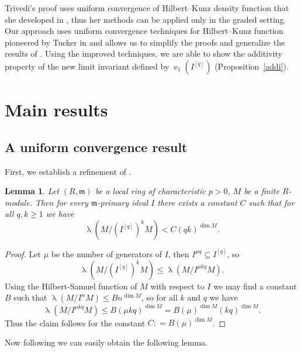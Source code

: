 \documentclass[12pt]{amsart}
\newcommand{\length}{\operatorname{\lambda}}
\newcommand{\mf}[1]{\mathfrak #1}
\DeclareMathOperator{\eh}{e}
\renewcommand{\frq}[1]{{#1}^{[q]}}
\newtheorem{lemma}[theorem]{Lemma}
\theoremstyle{definition}
\theoremstyle{remark}
\numberwithin{theorem}{section}
\numberwithin{equation}{section}
\begin{document}
Trivedi's proof uses uniform convergence of 
Hilbert--Kunz density function that she developed in \cite{Trivedi2},
thus her methods can be applied only in the graded setting. 
Our approach uses uniform convergence techniques for Hilbert--Kunz function
pioneered by Tucker in \cite{Tucker} and allows us to simplify the proofs and generalize the results of 
\cite{Trivedi}. 
Using the improved techniques, we 
are able to show the additivity property of the new limit invariant defined by 
$\eh_1 (\frq{I})$ (Proposition~\ref{addi}).



\section{Main results}\label{main section}

\subsection{A uniform convergence result}\label{HK equi convergence}


First, we establish a refinement of \cite[Lemma~3.2]{Tucker}.

\begin{lemma}\label{boundlemma}
Let $(R, \mf m)$ be a local ring of characteristic $p > 0$, 
$M$ be a finite $R$-module.
Then for every $\mf m$-primary ideal $I$ 
there exists a constant $C$ such that for all $q, k \geq 1$ we have
\[
\length (M/(\frq{I})^kM) < C (qk)^{\dim M}.
\]
\end{lemma}
\begin{proof}
Let $\mu $ be the number of generators of $I$, then $I^{\mu q} \subseteq \frq{I}$, 
so 
\[
\length (M/(\frq{I})^kM) \leq \length (M/I^{\mu kq}M).
\]
Using the Hilbert-Samuel function of $M$ with respect to $I$ we may find a constant $B$ such that
$\length (M/I^nM) \leq B n^{\dim M}$, so for all $k$ and $q$ we have
\[
\length (M/I^{\mu kq}M) \leq B(\mu k q)^{\dim M} = B (\mu)^{\dim M} (kq)^{\dim M}.
\]
Thus the claim follows for the constant $C : = B (\mu)^{\dim M}$. 
\end{proof}



Now following \cite[Lemma~3.3]{Tucker} we can easily obtain the following lemma.
\end{document}
